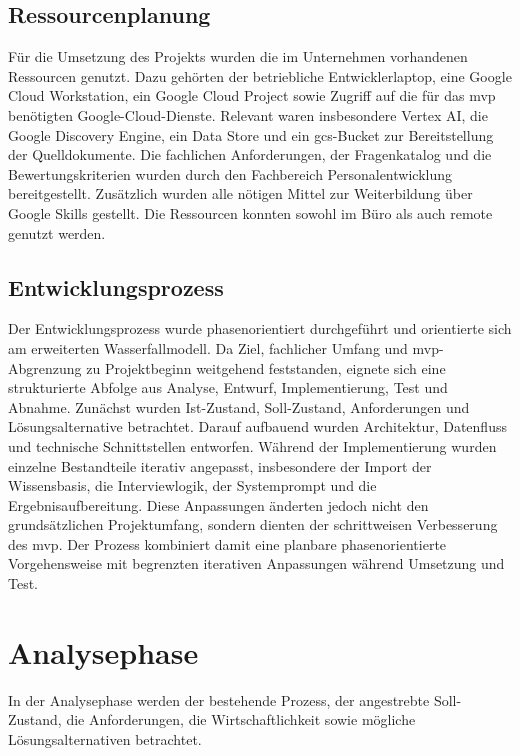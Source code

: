 \documentclass[
  10pt,
  ngerman,
  a4paper,
  toc=graduated,
  numbers=noenddot,
  headings=standardclasses,
  nonumberlist
]{scrartcl}
\begin{document}
\subsection{Ressourcenplanung}
\label{ressourcenplanung}

Für die Umsetzung des Projekts wurden die im Unternehmen vorhandenen Ressourcen genutzt. Dazu gehörten der betriebliche Entwicklerlaptop, eine Google Cloud Workstation, ein Google Cloud Project sowie Zugriff auf die für das \gls{mvp} benötigten Google-Cloud-Dienste. Relevant waren insbesondere Vertex AI, die Google Discovery Engine, ein Data Store und ein \gls{gcs}-Bucket zur Bereitstellung der Quelldokumente. Die fachlichen Anforderungen, der Fragenkatalog und die Bewertungskriterien wurden durch den Fachbereich Personalentwicklung bereitgestellt.  Zusätzlich wurden alle nötigen Mittel zur Weiterbildung über Google Skills gestellt. Die Ressourcen konnten sowohl im Büro als auch remote genutzt werden.

\subsection{Entwicklungsprozess}
\label{entwicklungsprozess}

Der Entwicklungsprozess wurde phasenorientiert durchgeführt und orientierte sich am erweiterten Wasserfallmodell. Da Ziel, fachlicher Umfang und \gls{mvp}-Abgrenzung zu Projektbeginn weitgehend feststanden, eignete sich eine strukturierte Abfolge aus Analyse, Entwurf, Implementierung, Test und Abnahme. Zunächst wurden Ist-Zustand, Soll-Zustand, Anforderungen und Lösungsalternative betrachtet. Darauf aufbauend wurden Architektur, Datenfluss und technische Schnittstellen entworfen. Während der Implementierung wurden einzelne Bestandteile iterativ angepasst, insbesondere der Import der Wissensbasis, die Interviewlogik, der Systemprompt und die Ergebnisaufbereitung. Diese Anpassungen änderten jedoch nicht den grundsätzlichen Projektumfang, sondern dienten der schrittweisen Verbesserung des \gls{mvp}. Der Prozess kombiniert damit eine planbare phasenorientierte Vorgehensweise mit begrenzten iterativen Anpassungen während Umsetzung und Test.

\section{Analysephase}
\label{analysephase}
In der Analysephase werden der bestehende Prozess, der angestrebte Soll-Zustand, die Anforderungen, die Wirtschaftlichkeit sowie mögliche Lösungsalternativen betrachtet.
\end{document}
